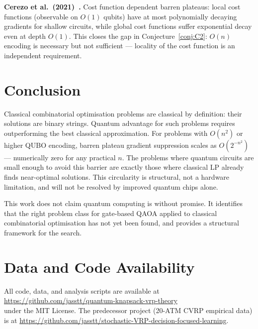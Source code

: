 \documentclass[11pt]{article}
\theoremstyle{remark}
\begin{document}
\textbf{Cerezo et al.\ (2021)~\cite{cerezo2021cost}.}
Cost function dependent barren plateaus: local cost functions (observable on
$O(1)$ qubits) have at most polynomially decaying gradients for shallow
circuits, while global cost functions suffer exponential decay even at depth
$O(1)$. This closes the gap in Conjecture~\ref{conj:C2}: $O(n)$ encoding
is necessary but not sufficient --- locality of the cost function is an
independent requirement.

\section*{Conclusion}

Classical combinatorial optimisation problems are classical by definition:
their solutions are binary strings. Quantum advantage for such problems
requires outperforming the best classical approximation. For problems with
$O(n^2)$ or higher QUBO encoding, barren plateau gradient suppression scales
as $O(2^{-n^2})$ --- numerically zero for any practical $n$. The problems
where quantum circuits are small enough to avoid this barrier are exactly
those where classical LP already finds near-optimal solutions. This
circularity is structural, not a hardware limitation, and will not be
resolved by improved quantum chips alone.

This work does not claim quantum computing is without promise. It identifies
that the right problem class for gate-based QAOA applied to classical
combinatorial optimisation has not yet been found, and provides a structural
framework for the search.

\section*{Data and Code Availability}

All code, data, and analysis scripts are available at\\
\url{https://github.com/jasstt/quantum-knapsack-vrp-theory}\\
under the MIT License. The predecessor project (20-ATM CVRP empirical data)
is at \url{https://github.com/jasstt/stochastic-VRP-decision-focused-learning}.



\end{document}
